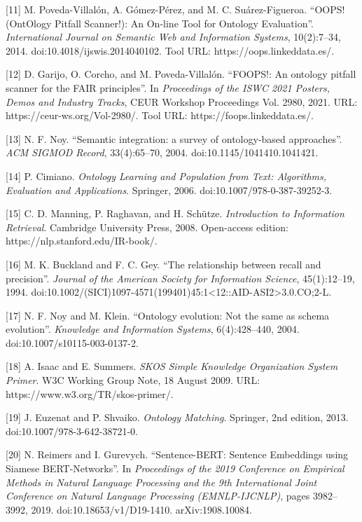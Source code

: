 \documentclass[
]{article}
\begin{document}
{[}11{]} M. Poveda-Villalón, A. Gómez-Pérez, and M. C. Suárez-Figueroa.
``OOPS! (OntOlogy Pitfall Scanner!): An On-line Tool for Ontology
Evaluation''. \emph{International Journal on Semantic Web and
Information Systems}, 10(2):7--34, 2014. doi:10.4018/ijswis.2014040102.
Tool URL: https://oops.linkeddata.es/.

{[}12{]} D. Garijo, O. Corcho, and M. Poveda-Villalón. ``FOOPS!: An
ontology pitfall scanner for the FAIR principles''. In \emph{Proceedings
of the ISWC 2021 Posters, Demos and Industry Tracks}, CEUR Workshop
Proceedings Vol. 2980, 2021. URL: https://ceur-ws.org/Vol-2980/. Tool
URL: https://foops.linkeddata.es/.

{[}13{]} N. F. Noy. ``Semantic integration: a survey of ontology-based
approaches''. \emph{ACM SIGMOD Record}, 33(4):65--70, 2004.
doi:10.1145/1041410.1041421.

{[}14{]} P. Cimiano. \emph{Ontology Learning and Population from Text:
Algorithms, Evaluation and Applications}. Springer, 2006.
doi:10.1007/978-0-387-39252-3.

{[}15{]} C. D. Manning, P. Raghavan, and H. Schütze. \emph{Introduction
to Information Retrieval}. Cambridge University Press, 2008. Open-access
edition: https://nlp.stanford.edu/IR-book/.

{[}16{]} M. K. Buckland and F. C. Gey. ``The relationship between recall
and precision''. \emph{Journal of the American Society for Information
Science}, 45(1):12--19, 1994.
doi:10.1002/(SICI)1097-4571(199401)45:1\textless12::AID-ASI2\textgreater3.0.CO;2-L.

{[}17{]} N. F. Noy and M. Klein. ``Ontology evolution: Not the same as
schema evolution''. \emph{Knowledge and Information Systems},
6(4):428--440, 2004. doi:10.1007/s10115-003-0137-2.

{[}18{]} A. Isaac and E. Summers. \emph{SKOS Simple Knowledge
Organization System Primer}. W3C Working Group Note, 18 August 2009.
URL: https://www.w3.org/TR/skos-primer/.

{[}19{]} J. Euzenat and P. Shvaiko. \emph{Ontology Matching}. Springer,
2nd edition, 2013. doi:10.1007/978-3-642-38721-0.

{[}20{]} N. Reimers and I. Gurevych. ``Sentence-BERT: Sentence
Embeddings using Siamese BERT-Networks''. In \emph{Proceedings of the
2019 Conference on Empirical Methods in Natural Language Processing and
the 9th International Joint Conference on Natural Language Processing
(EMNLP-IJCNLP)}, pages 3982--3992, 2019. doi:10.18653/v1/D19-1410.
arXiv:1908.10084.
\end{document}
